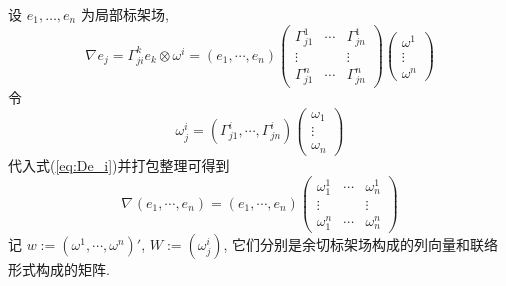 \documentclass{book}
\newcommand{\lc}[2]{\nabla_{#1}{#2}}
\begin{document}
            设 $e_1,\dots,e_n$ 为局部标架场, 
            \begin{equation}\label{eq:De_i}
                \lc{}{e_j} = \Gamma_{ji}^{k}e_k\otimes\omega^i = 
                (e_1,\cdots,e_n)
                \begin{pmatrix}
                    \Gamma_{j1}^{1} & \cdots & \Gamma_{jn}^{1} \\
                    \vdots & & \vdots \\
                    \Gamma_{j1}^{n} & \cdots & \Gamma_{jn}^{n}
                \end{pmatrix}
                \begin{pmatrix}
                    \omega^1 \\ \vdots \\ \omega^n
                \end{pmatrix}
            \end{equation}
            令
            \begin{equation*}
                \omega^i_j = 
                (\Gamma_{j1}^{i},\cdots,\Gamma_{jn}^{i})
                \begin{pmatrix}
                    \omega_1 \\ \vdots \\ \omega_n
                \end{pmatrix}
            \end{equation*}
            代入式(\ref{eq:De_i})并打包整理可得到
            \begin{equation}\label{df:connection-form}
                \lc{}{(e_1,\cdots,e_n)} = 
                (e_1,\cdots,e_n)
                \begin{pmatrix}
                    \omega^1_1 & \cdots & \omega^1_n \\
                    \vdots & & \vdots \\
                    \omega^n_1 & \cdots & \omega^n_n
                \end{pmatrix}
            \end{equation}
            记 $w := (\omega^1,\cdots,\omega^n)'$, $W := (\omega^i_j)$,  它们分别是余切标架场构成的列向量和联络形式构成的矩阵.
\end{document}
